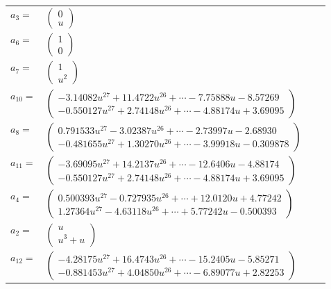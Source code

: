 \documentclass[1p]{elsarticle_modified}
\theoremstyle{definition}
\begin{document}
\begin{tabular}{m{7pt} m{180pt} m{7pt} m{180pt} }
\flushright $a_{3}=$&$\begin{pmatrix}0\\u\end{pmatrix}$ \\
\flushright $a_{6}=$&$\begin{pmatrix}1\\0\end{pmatrix}$ \\
\flushright $a_{7}=$&$\begin{pmatrix}1\\u^2\end{pmatrix}$ \\
\flushright $a_{10}=$&$\begin{pmatrix}-3.14082 u^{27}+11.4722 u^{26}+\cdots-7.75888 u-8.57269\\-0.550127 u^{27}+2.74148 u^{26}+\cdots-4.88174 u+3.69095\end{pmatrix}$ \\
\flushright $a_{8}=$&$\begin{pmatrix}0.791533 u^{27}-3.02387 u^{26}+\cdots-2.73997 u-2.68930\\-0.481655 u^{27}+1.30270 u^{26}+\cdots-3.99918 u-0.309878\end{pmatrix}$ \\
\flushright $a_{11}=$&$\begin{pmatrix}-3.69095 u^{27}+14.2137 u^{26}+\cdots-12.6406 u-4.88174\\-0.550127 u^{27}+2.74148 u^{26}+\cdots-4.88174 u+3.69095\end{pmatrix}$ \\
\flushright $a_{4}=$&$\begin{pmatrix}0.500393 u^{27}-0.727935 u^{26}+\cdots+12.0120 u+4.77242\\1.27364 u^{27}-4.63118 u^{26}+\cdots+5.77242 u-0.500393\end{pmatrix}$ \\
\flushright $a_{2}=$&$\begin{pmatrix}u\\u^3+u\end{pmatrix}$ \\
\flushright $a_{12}=$&$\begin{pmatrix}-4.28175 u^{27}+16.4743 u^{26}+\cdots-15.2405 u-5.85271\\-0.881453 u^{27}+4.04850 u^{26}+\cdots-6.89077 u+2.82253\end{pmatrix}$ \\

\end{tabular}
\end{document}

